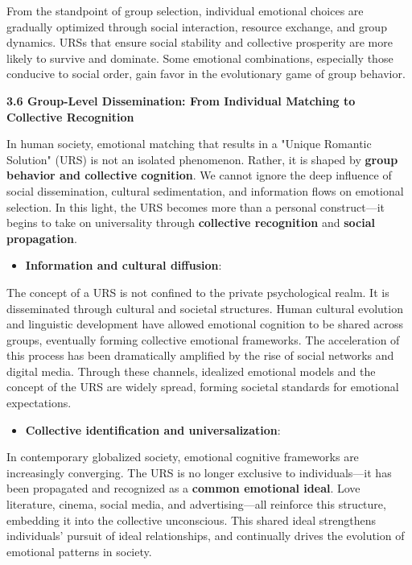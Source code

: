 \documentclass[
]{article}
\begin{document}
From the standpoint of group selection, individual emotional choices are
gradually optimized through social interaction, resource exchange, and
group dynamics. URSs that ensure social stability and collective
prosperity are more likely to survive and dominate. Some emotional
combinations, especially those conducive to social order, gain favor in
the evolutionary game of group behavior.

\textbf{3.6 Group-Level Dissemination: From Individual Matching to
Collective Recognition}

In human society, emotional matching that results in a "Unique Romantic
Solution" (URS) is not an isolated phenomenon. Rather, it is shaped by
\textbf{group behavior and collective cognition}. We cannot ignore the
deep influence of social dissemination, cultural sedimentation, and
information flows on emotional selection. In this light, the URS becomes
more than a personal construct---it begins to take on universality
through \textbf{collective recognition} and \textbf{social propagation}.

\begin{itemize}
\item
  \textbf{Information and cultural diffusion}:
\end{itemize}

The concept of a URS is not confined to the private psychological realm.
It is disseminated through cultural and societal structures. Human
cultural evolution and linguistic development have allowed emotional
cognition to be shared across groups, eventually forming collective
emotional frameworks. The acceleration of this process has been
dramatically amplified by the rise of social networks and digital media.
Through these channels, idealized emotional models and the concept of
the URS are widely spread, forming societal standards for emotional
expectations.

\begin{itemize}
\item
  \textbf{Collective identification and universalization}:
\end{itemize}

In contemporary globalized society, emotional cognitive frameworks are
increasingly converging. The URS is no longer exclusive to
individuals---it has been propagated and recognized as a \textbf{common
emotional ideal}. Love literature, cinema, social media, and
advertising---all reinforce this structure, embedding it into the
collective unconscious. This shared ideal strengthens individuals'
pursuit of ideal relationships, and continually drives the evolution of
emotional patterns in society.
\end{document}
